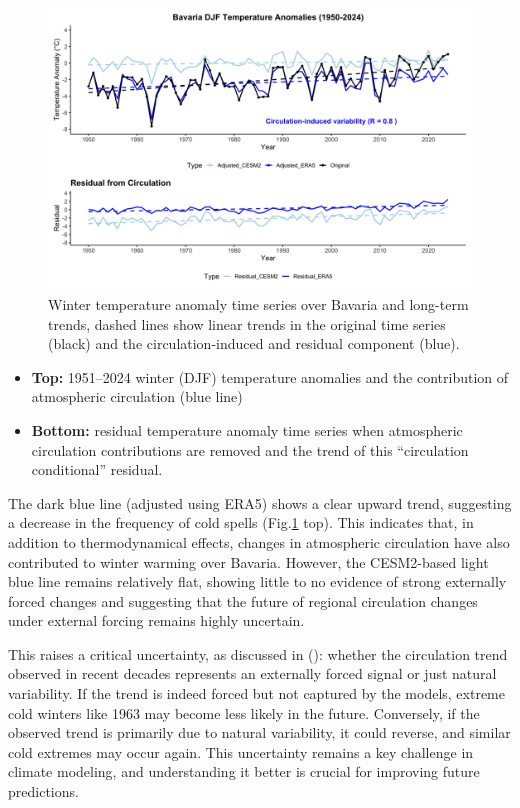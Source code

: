 \documentclass[
]{krantz}
\providecommand{\tightlist}{%
  \setlength{\itemsep}{0pt}\setlength{\parskip}{0pt}}
\begin{document}
\begin{figure}

{\centering \includegraphics[width=0.9\linewidth]{work/03-coldex/figures//dynamical adjustment} 

}

\caption{Winter temperature anomaly time series over Bavaria and long-term trends, dashed lines show linear trends in the original time series (black) and the circulation-induced and residual component (blue).}\label{fig:dynamical-trend}
\end{figure}

\begin{itemize}
\tightlist
\item
  \textbf{Top:} 1951--2024 winter (DJF) temperature anomalies and the contribution of atmospheric circulation (blue line)
\item
  \textbf{Bottom:} residual temperature anomaly time series when atmospheric circulation contributions are removed and the trend of this ``circulation conditional'' residual.
\end{itemize}

The dark blue line (adjusted using ERA5) shows a clear upward trend, suggesting a decrease in the frequency of cold spells (Fig.\ref{fig:dynamical-trend} top). This indicates that, in addition to thermodynamical effects, changes in atmospheric circulation have also contributed to winter warming over Bavaria. However, the CESM2-based light blue line remains relatively flat, showing little to no evidence of strong externally forced changes and suggesting that the future of regional circulation changes under external forcing remains highly uncertain.

This raises a critical uncertainty, as discussed in (\citet{sippel2024}): whether the circulation trend observed in recent decades represents an externally forced signal or just natural variability. If the trend is indeed forced but not captured by the models, extreme cold winters like 1963 may become less likely in the future. Conversely, if the observed trend is primarily due to natural variability, it could reverse, and similar cold extremes may occur again. This uncertainty remains a key challenge in climate modeling, and understanding it better is crucial for improving future predictions.
\end{document}
